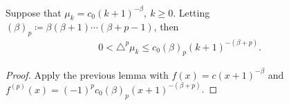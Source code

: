\begin{proposition}
  \label{prop:Aux_Difference_Derivative}
  Suppose that $\mu_k = c_0 (k+1)^{-\beta},~ k\geq 0$.
  Letting $(\beta)_p \coloneqq \beta (\beta+1)\cdots (\beta+p-1)$, then
  \begin{align*}
    0 < \triangle^{p} \mu_k \leq c_0 (\beta)_p  (k+1)^{-(\beta+p)}.
  \end{align*}
\end{proposition}
\begin{proof}
Apply the previous lemma with $f(x) = c(x+1)^{-\beta}$ and  $f^{(p)}(x) = (-1)^p c_0 (\beta)_p (x+1)^{-(\beta+p)}$.
\end{proof}

